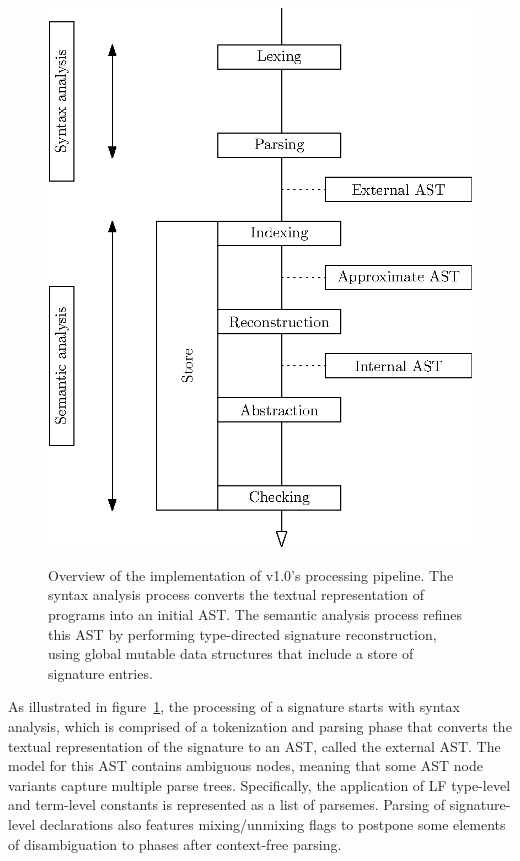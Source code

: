 \begin{figure}
\centering
\includegraphics{figures/legacy-beluga-processing-pipeline.eps}
\label{figure:legacy-beluga-processing-pipeline}
\caption{%
Overview of the implementation of \Beluga v1.0's processing pipeline.
The syntax analysis process converts the textual representation of \Beluga programs into an initial \ac{AST}.
The semantic analysis process refines this \ac{AST} by performing type-directed signature reconstruction, using global mutable data structures that include a store of signature entries.
}%
\end{figure}

As illustrated in figure~\ref{figure:legacy-beluga-processing-pipeline}, the processing of a \Beluga signature starts with syntax analysis, which is comprised of a tokenization and parsing phase that converts the textual representation of the signature to an \ac{AST}, called the external \ac{AST}.
The model for this \ac{AST} contains ambiguous nodes, meaning that some \ac{AST} node variants capture multiple parse trees.
Specifically, the application of LF type-level and term-level constants is represented as a list of parsemes.
Parsing of signature-level declarations also features mixing/unmixing flags to postpone some elements of disambiguation to phases after context-free parsing.

